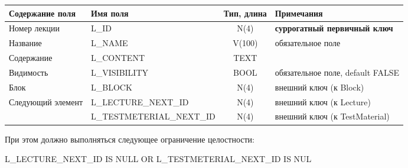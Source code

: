 \documentclass[a4paper,14pt]{article}
\begin{document}
\begin{table}[H]
	\begin{flushleft} 
	\end{flushleft}
	\begin{adjustbox}{width=\linewidth}
		\begin{tabular}{|l|l|c|l|}
			\hline
			Содержание поля                    & Имя поля                  & Тип, длина & Примечания                          \\ \hline
			Номер лекции                       & L\_ID                     &    N(4)    & \textbf{суррогатный первичный ключ} \\ \hline
			Название                           & L\_NAME                   &   V(100)   & обязательное поле                   \\ \hline
			Содержание                         & L\_CONTENT                &    TEXT    &                                     \\ \hline
			Видимость                          & L\_VISIBILITY             &    BOOL    & обязательное поле, default FALSE    \\ \hline
			Блок                               & L\_BLOCK                  &    N(4)    & внешний ключ (к Block)              \\ \hline
			\multirow{2}{*}{Следующий элемент} & L\_LECTURE\_NEXT\_ID      &    N(4)    & внешний ключ  (к Lecture)           \\ \cline{2-4}
			                                   & L\_TESTMETERIAL\_NEXT\_ID &    N(4)    & внешний ключ (к TestMaterial)       \\ \hline
		\end{tabular}
	\end{adjustbox}
\end{table}

При этом должно выполняться следующее ограничение целостности: 

L\_LECTURE\_NEXT\_ID IS NULL OR L\_TESTMETERIAL\_NEXT\_ID IS NUL

\end{document}
